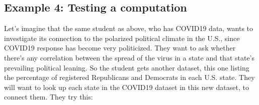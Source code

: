 \documentclass[letterpaper,10pt,english]{sphinxmanual}
\begin{document}
\subsection{Example 4: Testing a computation}
\label{\detokenize{chapter-7-abstraction:example-4-testing-a-computation}}
Let’s imagine that the same student as above, who has COVID\sphinxhyphen{}19 data, wants to investigate its connection to the polarized political climate in the U.S., since COVID\sphinxhyphen{}19 response has become very politicized.  They want to ask whether there’s any correlation between the spread of the virus in a state and that state’s prevailing political leaning.  So the student gets another dataset, this one listing the percentage of registered Republicans and Democrats in each U.S. state.  They will want to look up each state in the COVID\sphinxhyphen{}19 dataset in this new dataset, to connect them.  They try this:

\begin{sphinxVerbatim}[commandchars=\\\{\}]
   
   
                             

    \PYG{p}{[}\PYG{p}{]} \PYG{p}{[}\PYG{p}{]}  
    \PYG{p}{[}\PYG{p}{]} \PYG{p}{[}\PYG{p}{]}  

\PYG{p}{[}\PYG{p}{]}
\end{sphinxVerbatim}
\end{document}
